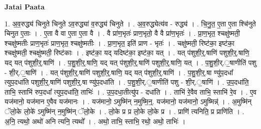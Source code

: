 \documentclass[17pt]{extarticle}
\begin{document}
\textbf{Jatai Paata} \newline

1. अ॒व॒रुद्ध्य॑ चिनुते चिनुते ऽव॒रुद्ध्या॑ व॒रुद्ध्य॑ चिनुते । . अ॒व॒रुद्ध्येत्य॑व - रुद्ध्य॑ । . चि॒नु॒त॒ ए॒ता ए॒ता श्चि॑नुते चिनुत ए॒ताः । . ए॒ता वै वा ए॒ता ए॒ता वै । . वै प्रा॑ण॒भृतः॑ प्राण॒भृतो॒ वै वै प्रा॑ण॒भृतः॑ । . प्रा॒ण॒भृत॒ श्चक्षु॑ष्मती॒ श्चक्षु॑ष्मतीः प्राण॒भृतः॑ प्राण॒भृत॒ श्चक्षु॑ष्मतीः । . प्रा॒ण॒भृत॒ इति॑ प्राण - भृतः॑ । . चक्षु॑ष्मती॒ रिष्ट॑का॒ इष्ट॑का॒ श्चक्षु॑ष्मती॒ श्चक्षु॑ष्मती॒ रिष्ट॑काः । . इष्ट॑का॒ यद् यदिष्ट॑का॒ इष्ट॑का॒ यत् । . यत् प॑शुशी॒र्॒.षाणि॑ पशुशी॒र्॒.षाणि॒ यद् यत् प॑शुशी॒र्॒.षाणि॑ । . प॒शु॒शी॒र्॒.षाणि॒ यद् यत् प॑शुशी॒र्॒.षाणि॑ पशुशी॒र्॒.षाणि॒ यत् । . प॒शु॒शी॒र्.॒षाणीति॑ पशु - शी॒र्.॒षाणि॑ । . यत् प॑शुशी॒र्॒.षाणि॑ पशुशी॒र्॒.षाणि॒ यद् यत् प॑शुशी॒र्॒.षाणि॑ । . प॒शु॒शी॒र्॒.षा ण्यु॑प॒दधा᳚ त्युप॒दधा॑ति पशुशी॒र्॒.षाणि॑ पशुशी॒र्॒.षा ण्यु॑प॒दधा॑ति । . प॒शु॒शी॒र्.॒षाणीति॑ पशु - शी॒र्.॒षाणि॑ । . उ॒प॒दधा॑ति॒ ताभि॒ स्ताभि॑ रुप॒दधा᳚ त्युप॒दधा॑ति॒ ताभिः॑ । . उ॒प॒दधा॒तीत्यु॑प - दधा॑ति । . ताभि॑ रे॒वैव ताभि॒ स्ताभि॑ रे॒व । . ए॒व यज॑मानो॒ यज॑मान ए॒वैव यज॑मानः । . यज॑मानो॒ ऽमुष्मि॑न् न॒मुष्मि॒न्॒. यज॑मानो॒ यज॑मानो॒ ऽमुष्मिन्न्॑ । . अ॒मुष्मि॑न् ॅलो॒के लो॒के॑ ऽमुष्मि॑न् न॒मुष्मि॑न् ॅलो॒के । . लो॒के प्र प्र लो॒के लो॒के प्र । . प्राणि॑ त्यनिति॒ प्र प्राणि॑ति । . अ॒नि॒ त्यथो॒ अथो॑ अनि त्यनि॒ त्यथो᳚ । . अथो॒ ताभि॒ स्ताभि॒ रथो॒ अथो॒ ताभिः॑ । \newline
\end{document}
